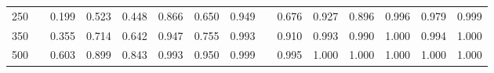 % 
\begin{tabular}{ccccccccccccccc}
  \hline
  \hline
250 &  & 0.199 & 0.523 & 0.448 & 0.866 & 0.650 & 0.949 &  & 0.676 & 0.927 & 0.896 & 0.996 & 0.979 & 0.999 \\ 
  350 &  & 0.355 & 0.714 & 0.642 & 0.947 & 0.755 & 0.993 &  & 0.910 & 0.993 & 0.990 & 1.000 & 0.994 & 1.000 \\ 
  500 &  & 0.603 & 0.899 & 0.843 & 0.993 & 0.950 & 0.999 &  & 0.995 & 1.000 & 1.000 & 1.000 & 1.000 & 1.000 \\ 
   \hline
\end{tabular}
